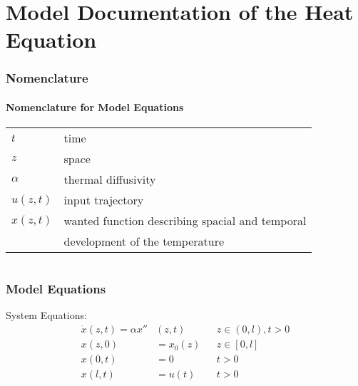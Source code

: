 \documentclass[10pt,a4paper]{article}
\begin{document}
	\part*{Model Documentation of the Heat Equation} %
	
	
	\section{Nomenclature} %
	\subsection{Nomenclature for Model Equations} %
	
	\begin{tabular}{ll}
		$t$ & time \\
		$z$ & space \\
		$\alpha$ & thermal diffusivity\\
		$u(z, t)$ & input trajectory \\
		$x(z, t)$ & wanted function describing spacial and temporal \\
					& development of the temperature
	\end{tabular}
	 
	
	\begin{tabular}{ll}

	\end{tabular}
	
	
	\section{Model Equations} %
	
	\noindent System Equations:			
	\begin{subequations}
	\begin{align*}
		\dot{x}(z,t) = \alpha x''&(z,t) && z\in (0, l), t>0\\
		x(z,0) &= x_0(z) && z\in [0,l]\\
		x(0,t) &= 0 && t>0\\
		x(l,t) &= u(t) && t>0
	\end{align*}
	\end{subequations}
\end{document}
